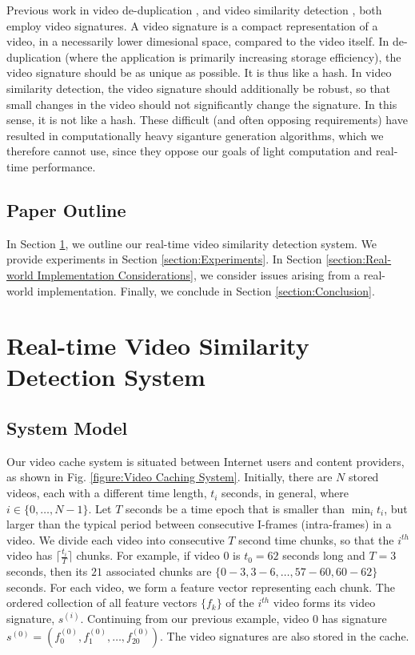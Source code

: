 \documentclass{article}
\begin{document}
Previous work in video de-duplication \cite{Chuanyi Liu}, \cite{Atul Katiyar} and video similarity detection \cite{Sen-ching S. Cheung}, \cite{Xian-Sheng Hua} both employ video signatures. A video signature is a compact representation of a video, in a necessarily lower dimesional space, compared to the video itself. In de-duplication (where the application is primarily increasing storage efficiency), the video signature should be as unique as possible. It is thus like a hash. In video similarity detection, the video signature should additionally be robust, so that small changes in the video should not significantly change the signature. In this sense, it is not like a hash. These difficult (and often opposing requirements) have resulted in computationally heavy siganture generation algorithms, which we therefore cannot use, since they oppose our goals of light computation and real-time performance.

\subsection{Paper Outline}
In Section \ref{section:Real-time Video Similarity Detection System}, we outline our real-time video similarity detection system. We provide experiments in Section \ref{section:Experiments}. In Section \ref{section:Real-world Implementation Considerations}, we consider issues arising from a real-world implementation. Finally, we conclude in Section \ref{section:Conclusion}.

\section{Real-time Video Similarity Detection System}
\label{section:Real-time Video Similarity Detection System}

\subsection{System Model}
Our video cache system is situated between Internet users and content providers, as shown in Fig. \ref{figure:Video Caching System}. Initially, there are $N$ stored videos, each with a different time length, $t_i$ seconds, in general, where $i \in \{0, \ldots, N-1\}$. Let $T$ seconds be a time epoch that is smaller than $\min_i t_i$, but larger than the typical period between consecutive I-frames (intra-frames) in a video. We divide each video into consecutive $T$ second time chunks, so that the $i^{th}$ video has $\lceil \frac{t_i}{T} \rceil$ chunks. For example, if video $0$ is $t_0 = 62$ seconds long and $T = 3$ seconds, then its $21$ associated chunks are $\{0-3, 3-6, \ldots, 57-60, 60-62\}$ seconds. For each video, we form a feature vector representing each chunk. The ordered collection of all feature vectors $\{f_k\}$ of the $i^{th}$ video forms its video signature, $s^{(i)}$. Continuing from our previous example, video $0$ has signature $s^{(0)} = \left( f^{(0)}_0, f^{(0)}_1, \ldots, f^{(0)}_{20} \right)$. The video signatures are also stored in the cache.
\end{document}
